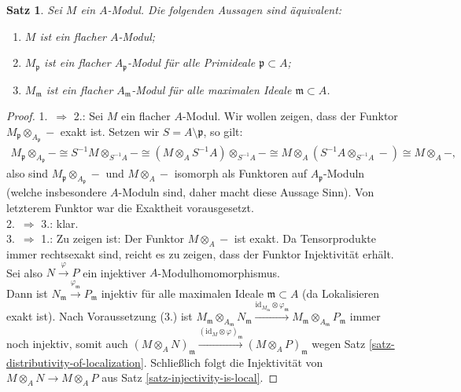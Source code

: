 \documentclass[reqno,12pt]{article}
\numberwithin{equation}{section}
\newcommand{\id}{\text{id}}
\theoremstyle{plain}
\newtheorem{proposition}[thm]{Satz}
\theoremstyle{definition}
\newcommand{\blank}{{-}}
\begin{document}
\begin{proposition}
Sei $M$ ein $A$-Modul. Die folgenden Aussagen sind äquivalent:
\begin{enumerate}
	\item $M$ ist ein flacher $A$-Modul;
	\item $M_\mathfrak{p}$ ist ein flacher $A_\mathfrak{p}$-Modul für alle Primideale $\mathfrak{p}\subset A$;
	\item $M_\mathfrak{m}$ ist ein flacher $A_\mathfrak{m}$-Modul für alle maximalen Ideale $\mathfrak{m}\subset A$.
\end{enumerate}
\end{proposition}
\begin{proof}
1.\ $\Rightarrow$ 2.: Sei $M$ ein flacher $A$-Modul. Wir wollen zeigen, dass der Funktor $M_\mathfrak{p}\otimes_{A_\mathfrak{p}}\blank$ exakt ist. Setzen wir $S=A\setminus \mathfrak{p}$, so gilt:
\begin{align*}
M_\mathfrak{p}\otimes_{A_\mathfrak{p}}\blank\cong S^{-1}M\otimes_{S^{-1}A}\blank \cong (M\otimes_A S^{-1}A)\otimes_{S^{-1}A}\blank \cong M\otimes_A(S^{-1}A\otimes_{S^{-1}A}\blank)\cong M\otimes_A \blank,
\end{align*} also sind $M_\mathfrak{p}\otimes_{A_\mathfrak{p}}\blank$ und $M\otimes_A \blank$ isomorph als Funktoren auf $A_\mathfrak{p}$-Moduln (welche insbesondere $A$-Moduln sind, daher macht diese Aussage Sinn).
Von letzterem Funktor war die Exaktheit vorausgesetzt.\\
2.\ $\Rightarrow$ 3.: klar.\\
3.\ $\Rightarrow$ 1.: Zu zeigen ist: Der Funktor $M\otimes_A\blank$ ist exakt. Da Tensorprodukte immer rechtsexakt sind, reicht es zu zeigen, dass der Funktor Injektivität erhält. Sei also $N\overset{\varphi}{\to}P$ ein injektiver $A$-Modulhomomorphismus.\\ Dann ist $N_\mathfrak{m}\overset{\varphi_\mathfrak{m}}{\to}P_\mathfrak{m}$ injektiv für alle maximalen Ideale $\mathfrak{m}\subset A$ (da Lokalisieren exakt ist). Nach Voraussetzung (3.) ist $M_\mathfrak{m}\otimes_{A_\mathfrak{m}}N_\mathfrak{m}\overset{\id_{M_\mathfrak{m}}\otimes \varphi_\mathfrak{m}}{\longrightarrow}M_\mathfrak{m}\otimes_{A_\mathfrak{m}}P_\mathfrak{m}$ immer noch injektiv, somit auch $(M\otimes_A N)_\mathfrak{m}\overset{(\id_M\otimes \varphi)_\mathfrak{m}}{\longrightarrow}(M\otimes_A P)_\mathfrak{m}$ wegen Satz \ref{satz-distributivity-of-localization}. Schließlich folgt die Injektivität von $M\otimes_A N\to M\otimes_A P$ aus Satz \ref{satz-injectivity-is-local}.
\end{proof}
\end{document}
